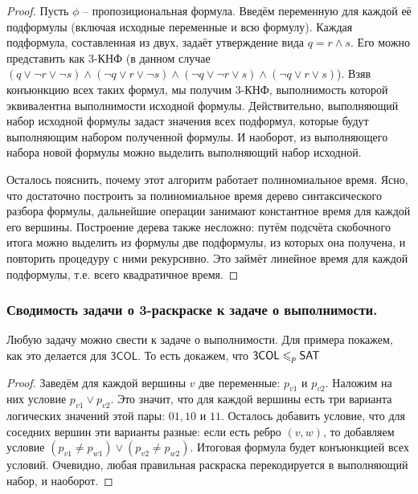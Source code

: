 \begin{proof}
Пусть $\phi$ -- пропозициональная формула. Введём переменную для каждой её подформулы (включая исходные переменные и всю формулу).
Каждая подформула, составленная из двух, задаёт утверждение вида $q = r \wedge s$. Его можно представить как 3-КНФ (в данном случае $(q \vee \neg r \vee \neg s) \wedge (\neg q \vee r \vee \neg s) \wedge (\neg q \vee \neg r \vee s) \wedge (\neg q \vee r \vee s)$). Взяв конъюнкцию всех таких формул, мы получим 3-КНФ, выполнимость которой эквивалентна выполнимости исходной формулы. Действительно, выполняющий набор исходной формулы задаст значения всех подформул, которые будут выполняющим набором полученной формулы. И наоборот, из выполняющего набора новой формулы можно выделить выполняющий набор исходной.

Осталось пояснить, почему этот алгоритм работает полиномиальное время.
Ясно, что достаточно построить за полиномиальное время дерево синтаксического разбора формулы, дальнейшие операции занимают константное время
для каждой его вершины. Построение дерева также несложно: путём подсчёта
скобочного итога можно выделить из формулы две подформулы, из которых
она получена, и повторить процедуру с ними рекурсивно. Это займёт линейное
время для каждой подформулы, т.е. всего квадратичное время.
\end{proof}

\subsubsection{Сводимость задачи о 3-раскраске к задаче о выполнимости.}
\begin{statement}
Любую задачу можно свести к задаче о выполнимости. Для примера покажем, как это делается для $\mathsf{3COL}$.
\newline То есть докажем, что $\mathsf{3COL} \leqslant_p \mathsf{SAT}$
\end{statement}

\begin{proof}
Заведём для каждой вершины $v$ две переменные: $p_{v1}$ и $p_{v2}$.
Наложим на них условие $p_{v1} \vee p_{v2}$. Это значит, что для каждой вершины есть
три варианта логических значений этой пары: $01, 10$ и $11$. Осталось добавить
условие, что для соседних вершин эти варианты разные: если есть ребро $(v, w)$,
то добавляем условие $(p_{v1} \neq p_{w1}) \vee (p_{v2} \neq p_{w2})$. Итоговая формула будет конъюнкцией всех условий. Очевидно, любая правильная раскраска перекодируется
в выполняющий набор, и наоборот.
\end{proof}

